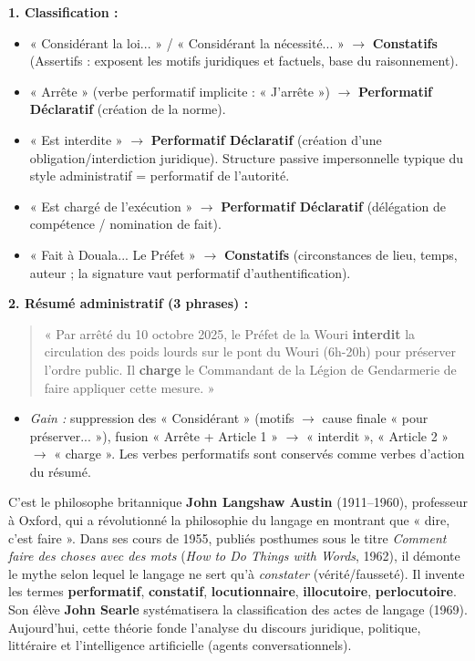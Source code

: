 \documentclass[11pt]{article}
\begin{document}
\begin{corrige}[Exercice n°1]
\textbf{1. Classification :}
\begin{itemize}
    \item « Considérant la loi... » / « Considérant la nécessité... » $\rightarrow$ \textbf{Constatifs} (Assertifs : exposent les motifs juridiques et factuels, base du raisonnement).
    \item « Arrête » (verbe performatif implicite : « J'arrête ») $\rightarrow$ \textbf{Performatif Déclaratif} (création de la norme).
    \item « Est interdite » $\rightarrow$ \textbf{Performatif Déclaratif} (création d'une obligation/interdiction juridique). Structure passive impersonnelle typique du style administratif = performatif de l'autorité.
    \item « Est chargé de l'exécution » $\rightarrow$ \textbf{Performatif Déclaratif} (délégation de compétence / nomination de fait).
    \item « Fait à Douala... Le Préfet » $\rightarrow$ \textbf{Constatifs} (circonstances de lieu, temps, auteur ; la signature vaut performatif d'authentification).
\end{itemize}

\textbf{2. Résumé administratif (3 phrases) :}
\begin{quote}
« Par arrêté du 10 octobre 2025, le Préfet de la Wouri \textbf{interdit} la circulation des poids lourds sur le pont du Wouri (6h-20h) pour préserver l'ordre public. Il \textbf{charge} le Commandant de la Légion de Gendarmerie de faire appliquer cette mesure. »
\end{quote}
\begin{itemize}
    \item \emph{Gain :} suppression des « Considérant » (motifs $\rightarrow$ cause finale « pour préserver... »), fusion « Arrête + Article 1 » $\rightarrow$ « interdit », « Article 2 » $\rightarrow$ « charge ». Les verbes performatifs sont conservés comme verbes d'action du résumé.
\end{itemize}
\end{corrige}

\begin{savaistu}
C'est le philosophe britannique \textbf{John Langshaw Austin} (1911--1960), professeur à Oxford, qui a révolutionné la philosophie du langage en montrant que « dire, c'est faire ». Dans ses cours de 1955, publiés posthumes sous le titre \emph{Comment faire des choses avec des mots} (\emph{How to Do Things with Words}, 1962), il démonte le mythe selon lequel le langage ne sert qu'à \emph{constater} (vérité/fausseté). Il invente les termes \textbf{performatif}, \textbf{constatif}, \textbf{locutionnaire}, \textbf{illocutoire}, \textbf{perlocutoire}. Son élève \textbf{John Searle} systématisera la classification des actes de langage (1969). Aujourd'hui, cette théorie fonde l'analyse du discours juridique, politique, littéraire et l'intelligence artificielle (agents conversationnels).
\end{savaistu}
\end{document}
